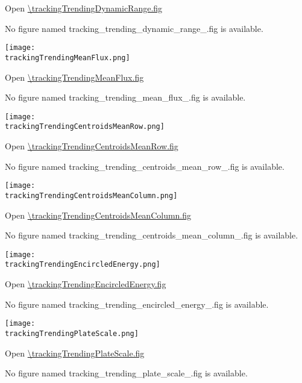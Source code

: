 Open \url{\trackingTrendingDynamicRange.fig}

\else
No figure named tracking\_trending\_dynamic\_range\_\channelSuffix.fig
is available.
\fi

\vspace{5ex}

\ifdefined \trackingTrendingMeanFlux

\begin{center}
  \texttt{[image: \\trackingTrendingMeanFlux.png]}
\end{center}

Open \url{\trackingTrendingMeanFlux.fig}

\else
No figure named tracking\_trending\_mean\_flux\_\channelSuffix.fig is
available.
\fi

\ifdefined \trackingTrendingCentroidsMeanRow

\begin{center}
  \texttt{[image: \\trackingTrendingCentroidsMeanRow.png]}
\end{center}

Open \url{\trackingTrendingCentroidsMeanRow.fig}

\else
No figure named
tracking\_trending\_centroids\_mean\_row\_\channelSuffix.fig is
available.
\fi

\vspace{5ex}

\ifdefined \trackingTrendingCentroidsMeanColumn

\begin{center}
  \texttt{[image: \\trackingTrendingCentroidsMeanColumn.png]}
\end{center}

Open \url{\trackingTrendingCentroidsMeanColumn.fig}

\else
No figure named
tracking\_trending\_centroids\_mean\_column\_\channelSuffix.fig is
available.
\fi

\ifdefined \trackingTrendingEncircledEnergy

\begin{center}
  \texttt{[image: \\trackingTrendingEncircledEnergy.png]}
\end{center}

Open \url{\trackingTrendingEncircledEnergy.fig}

\else
No figure named
tracking\_trending\_encircled\_energy\_\channelSuffix.fig is
available.
\fi

\vspace{5ex}

\ifdefined \trackingTrendingPlateScale

\begin{center}
  \texttt{[image: \\trackingTrendingPlateScale.png]}
\end{center}

Open \url{\trackingTrendingPlateScale.fig}

\else
No figure named tracking\_trending\_plate\_scale\_\channelSuffix.fig
is available.
\fi

\clearpage
